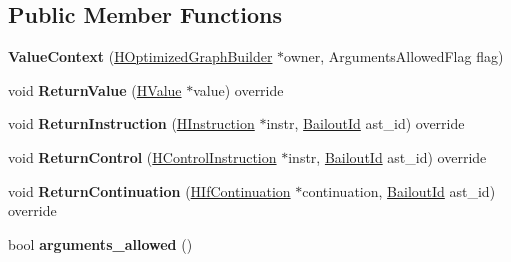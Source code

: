\subsection*{Public Member Functions}
\begin{DoxyCompactItemize}
\item 
{\bfseries Value\+Context} (\hyperlink{classv8_1_1internal_1_1_h_optimized_graph_builder}{H\+Optimized\+Graph\+Builder} $\ast$owner, Arguments\+Allowed\+Flag flag)\hypertarget{classv8_1_1internal_1_1_value_context_a56c2e749d006ee174997e2f1aaabfbc0}{}\label{classv8_1_1internal_1_1_value_context_a56c2e749d006ee174997e2f1aaabfbc0}

\item 
void {\bfseries Return\+Value} (\hyperlink{classv8_1_1internal_1_1_h_value}{H\+Value} $\ast$value) override\hypertarget{classv8_1_1internal_1_1_value_context_a9d4bb94511a2aaaf8bc7b53428467fe2}{}\label{classv8_1_1internal_1_1_value_context_a9d4bb94511a2aaaf8bc7b53428467fe2}

\item 
void {\bfseries Return\+Instruction} (\hyperlink{classv8_1_1internal_1_1_h_instruction}{H\+Instruction} $\ast$instr, \hyperlink{classv8_1_1internal_1_1_bailout_id}{Bailout\+Id} ast\+\_\+id) override\hypertarget{classv8_1_1internal_1_1_value_context_a5fb7e34ea9b90a3d614346d8e05a2bf2}{}\label{classv8_1_1internal_1_1_value_context_a5fb7e34ea9b90a3d614346d8e05a2bf2}

\item 
void {\bfseries Return\+Control} (\hyperlink{classv8_1_1internal_1_1_h_control_instruction}{H\+Control\+Instruction} $\ast$instr, \hyperlink{classv8_1_1internal_1_1_bailout_id}{Bailout\+Id} ast\+\_\+id) override\hypertarget{classv8_1_1internal_1_1_value_context_a7685b14a44cd0ee34e101a201510d39d}{}\label{classv8_1_1internal_1_1_value_context_a7685b14a44cd0ee34e101a201510d39d}

\item 
void {\bfseries Return\+Continuation} (\hyperlink{classv8_1_1internal_1_1_h_if_continuation}{H\+If\+Continuation} $\ast$continuation, \hyperlink{classv8_1_1internal_1_1_bailout_id}{Bailout\+Id} ast\+\_\+id) override\hypertarget{classv8_1_1internal_1_1_value_context_a41f2b7f36af3eba4fa99ab10b1bf9410}{}\label{classv8_1_1internal_1_1_value_context_a41f2b7f36af3eba4fa99ab10b1bf9410}

\item 
bool {\bfseries arguments\+\_\+allowed} ()\hypertarget{classv8_1_1internal_1_1_value_context_adbede87035d686030ca1c3b378061385}{}\label{classv8_1_1internal_1_1_value_context_adbede87035d686030ca1c3b378061385}

\end{DoxyCompactItemize}
